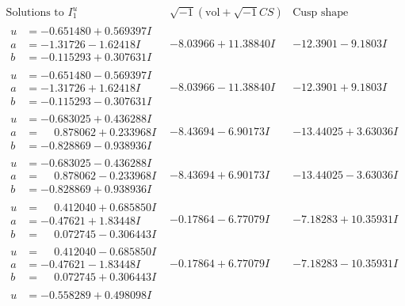 \documentclass[1p]{elsarticle_modified}
\theoremstyle{definition}
\newcommand{\I}{\sqrt{-1}}
\begin{document}
$$\begin{array}{c|c|c}  
\text{Solutions to }I^u_{1}& \I (\text{vol} + \sqrt{-1}CS) & \text{Cusp shape}\\
 \hline 
\begin{aligned}
u &= -0.651480 + 0.569397 I \\
a &= -1.31726 - 1.62418 I \\
b &= -0.115293 + 0.307631 I\end{aligned}
 & -8.03966 + 11.38840 I & -12.3901 - 9.1803 I \\ \hline\begin{aligned}
u &= -0.651480 - 0.569397 I \\
a &= -1.31726 + 1.62418 I \\
b &= -0.115293 - 0.307631 I\end{aligned}
 & -8.03966 - 11.38840 I & -12.3901 + 9.1803 I \\ \hline\begin{aligned}
u &= -0.683025 + 0.436288 I \\
a &= \phantom{-}0.878062 + 0.233968 I \\
b &= -0.828869 - 0.938936 I\end{aligned}
 & -8.43694 - 6.90173 I & -13.44025 + 3.63036 I \\ \hline\begin{aligned}
u &= -0.683025 - 0.436288 I \\
a &= \phantom{-}0.878062 - 0.233968 I \\
b &= -0.828869 + 0.938936 I\end{aligned}
 & -8.43694 + 6.90173 I & -13.44025 - 3.63036 I \\ \hline\begin{aligned}
u &= \phantom{-}0.412040 + 0.685850 I \\
a &= -0.47621 + 1.83448 I \\
b &= \phantom{-}0.072745 - 0.306443 I\end{aligned}
 & -0.17864 - 6.77079 I & -7.18283 + 10.35931 I \\ \hline\begin{aligned}
u &= \phantom{-}0.412040 - 0.685850 I \\
a &= -0.47621 - 1.83448 I \\
b &= \phantom{-}0.072745 + 0.306443 I\end{aligned}
 & -0.17864 + 6.77079 I & -7.18283 - 10.35931 I \\ \hline\begin{aligned}
u &= -0.558289 + 0.498098 I \\

\end{aligned}
\end{array}$$
\end{document}
